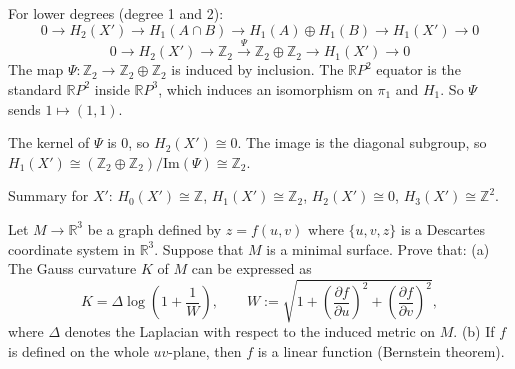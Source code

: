 \begin{solution}
For lower degrees (degree 1 and 2):
\[ 0 \to H_2(X') \to H_1(A \cap B) \to H_1(A) \oplus H_1(B) \to H_1(X') \to 0 \]
\[ 0 \to H_2(X') \to \mathbb{Z}_2 \xrightarrow{\Psi} \mathbb{Z}_2 \oplus \mathbb{Z}_2 \to H_1(X') \to 0 \]
The map $\Psi: \mathbb{Z}_2 \to \mathbb{Z}_2 \oplus \mathbb{Z}_2$ is induced by inclusion. The $\mathbb{R}P^2$ equator is the standard $\mathbb{R}P^2$ inside $\mathbb{R}P^3$, which induces an isomorphism on $\pi_1$ and $H_1$. So $\Psi$ sends $1 \mapsto (1, 1)$.

The kernel of $\Psi$ is $0$, so $H_2(X') \cong 0$.
The image is the diagonal subgroup, so $H_1(X') \cong (\mathbb{Z}_2 \oplus \mathbb{Z}_2) / \text{Im}(\Psi) \cong \mathbb{Z}_2$.

Summary for $X'$: $H_0(X') \cong \mathbb{Z}$, $H_1(X') \cong \mathbb{Z}_2$, $H_2(X') \cong 0$, $H_3(X') \cong \mathbb{Z}^2$.
\end{solution}

\begin{exercise}
\label{geometry:2014:2}
Let $M \to \mathbb{R}^{3}$ be a graph defined by $z = f(u, v)$ where $\{u, v, z\}$ is a Descartes coordinate system in $\mathbb{R}^{3}$. Suppose that $M$ is a minimal surface. Prove that:
(a) The Gauss curvature $K$ of $M$ can be expressed as
\[ K = \Delta \log\!\left(1 + \frac{1}{W}\right), \qquad W := \sqrt{1 + \left(\frac{\partial f}{\partial u}\right)^{2} + \left(\frac{\partial f}{\partial v}\right)^{2}}, \]
where $\Delta$ denotes the Laplacian with respect to the induced metric on $M$.
(b) If $f$ is defined on the whole $uv$-plane, then $f$ is a linear function (Bernstein theorem).
\end{exercise}

